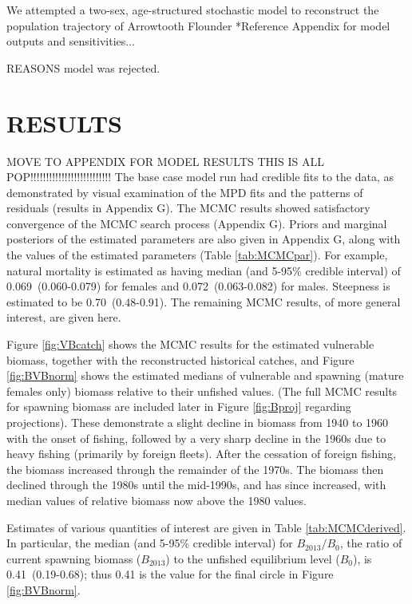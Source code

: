 We attempted a two-sex, age-structured stochastic model to reconstruct the population trajectory of Arrowtooth Flounder
*Reference Appendix for model outputs and sensitivities...

REASONS model was rejected.

\section{RESULTS}

MOVE TO APPENDIX FOR MODEL RESULTS
THIS IS ALL POP!!!!!!!!!!!!!!!!!!!!!!!!!!
The base case model run had credible fits to the data, as demonstrated by visual examination of the MPD fits and the patterns of residuals (results in Appendix G). The MCMC results showed satisfactory convergence of the MCMC search process (Appendix G). Priors and marginal posteriors of the estimated parameters are also given in Appendix G, along with the values of the estimated parameters (Table \ref{tab:MCMCpar}). For example, natural mortality is estimated as having median (and 5-95\% credible interval) of 0.069~(0.060-0.079) for females and 0.072~(0.063-0.082) for males. Steepness is estimated to be 0.70~(0.48-0.91). The remaining MCMC results, of more general interest, are given here.

Figure \ref{fig:VBcatch} shows the MCMC results for the estimated vulnerable biomass, together with the reconstructed historical catches, and Figure \ref{fig:BVBnorm} shows the estimated medians of vulnerable and spawning (mature females only) biomass relative to their unfished values. (The full MCMC results for spawning biomass are included later in Figure \ref{fig:Bproj} regarding projections). These demonstrate a slight decline in biomass from 1940 to 1960 with the onset of fishing, followed by a very sharp decline in the 1960s due to heavy fishing (primarily by foreign fleets). After the cessation of foreign fishing, the biomass increased through the remainder of the 1970s. The biomass then declined through the 1980s until the mid-1990s, and has since increased, with median values of relative biomass now above the 1980 values.

Estimates of various quantities of interest are given in Table \ref{tab:MCMCderived}. In particular, the median (and 5-95\% credible interval) for $B_{2013}/B_0$, the ratio of current spawning biomass ($B_{2013}$) to the unfished equilibrium level ($B_0$), is 0.41~(0.19-0.68); thus 0.41 is the value for the final circle in Figure \ref{fig:BVBnorm}.

